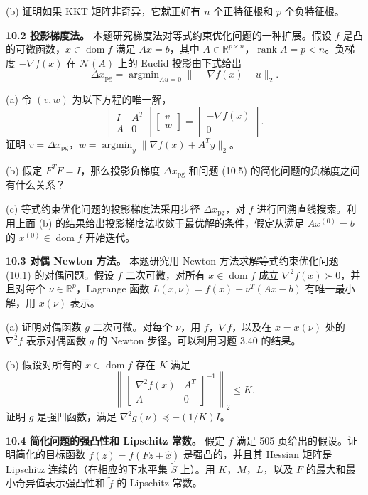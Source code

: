 \documentclass[UTF8,12pt,a4paper,fontset=fandol]{ctexart}
\begin{document}
(b) 证明如果 KKT 矩阵非奇异，它就正好有 $n$ 个正特征根和 $p$ 个负特征根。

\noindent\textbf{10.2 投影梯度法。}\quad
本题研究梯度法对等式约束优化问题的一种扩展。假设 $f$ 是凸的可微函数，$x\in\operatorname{dom} f$ 满足 $Ax=b$，其中 $A\in\mathbb{R}^{p\times n}$，$\operatorname{rank}A=p<n$。负梯度 $-\nabla f(x)$ 在 $\mathcal{N}(A)$ 上的 Euclid 投影由下式给出
\[
\Delta x_{\mathrm{pg}}=\mathop{\mathrm{argmin}}_{Au=0}\|-\nabla f(x)-u\|_2.
\]

(a) 令 $(v,w)$ 为以下方程的唯一解，
\[
\begin{bmatrix}
I&A^T\\
A&0
\end{bmatrix}
\begin{bmatrix}
v\\
w
\end{bmatrix}
=
\begin{bmatrix}
-\nabla f(x)\\
0
\end{bmatrix}.
\]
证明 $v=\Delta x_{\mathrm{pg}}$，$w=\mathop{\mathrm{argmin}}_y\|\nabla f(x)+A^Ty\|_2$。

(b) 假定 $F^TF=I$，那么投影负梯度 $\Delta x_{\mathrm{pg}}$ 和问题 (10.5) 的简化问题的负梯度之间有什么关系？

(c) 等式约束优化问题的投影梯度法采用步径 $\Delta x_{\mathrm{pg}}$，对 $f$ 进行回溯直线搜索。利用上面 (b) 的结果给出投影梯度法收敛于最优解的条件，假定从满足 $Ax^{(0)}=b$ 的 $x^{(0)}\in\operatorname{dom} f$ 开始迭代。

\noindent\textbf{10.3 对偶 Newton 方法。}\quad
本题研究用 Newton 方法求解等式约束优化问题 (10.1) 的对偶问题。假设 $f$ 二次可微，对所有 $x\in\operatorname{dom} f$ 成立 $\nabla^2 f(x)\succ0$，并且对每个 $\nu\in\mathbb{R}^p$，Lagrange 函数 $L(x,\nu)=f(x)+\nu^T(Ax-b)$ 有唯一最小解，用 $x(\nu)$ 表示。

(a) 证明对偶函数 $g$ 二次可微。对每个 $\nu$，用 $f$，$\nabla f$，以及在 $x=x(\nu)$ 处的 $\nabla^2 f$ 表示对偶函数 $g$ 的 Newton 步径。可以利用习题 3.40 的结果。

(b) 假设对所有的 $x\in\operatorname{dom} f$ 存在 $K$ 满足
\[
\left\|
\begin{bmatrix}
\nabla^2 f(x)&A^T\\
A&0
\end{bmatrix}^{-1}
\right\|_2\leq K.
\]
证明 $g$ 是强凹函数，满足 $\nabla^2 g(\nu)\preceq -(1/K)I$。

\noindent\textbf{10.4 简化问题的强凸性和 Lipschitz 常数。}\quad
假定 $f$ 满足 505 页给出的假设。证明简化的目标函数 $\tilde f(z)=f(Fz+\hat{x})$ 是强凸的，并且其 Hessian 矩阵是 Lipschitz 连续的（在相应的下水平集 $\tilde S$ 上）。用 $K$，$M$，$L$，以及 $F$ 的最大和最小奇异值表示强凸性和 $\tilde f$ 的 Lipschitz 常数。
\end{document}
